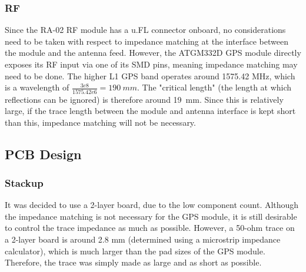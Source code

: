 \subsubsection{RF}
Since the RA-02 RF module has a u.FL connector onboard, no considerations need to be taken with respect to impedance matching at the interface between the module and the antenna feed. However, the ATGM332D GPS module directly exposes its RF input via one of its SMD pins, meaning impedance matching may need to be done. The higher L1 GPS band operates around 1575.42 MHz, which is a wavelength of $\frac{3e8}{1575.42e6} = \SI{190}{mm}$. The "critical length" (the length at which reflections can be ignored) is therefore around \SI{19}{mm}. Since this is relatively large, if the trace length between the module and antenna interface is kept short than this, impedance matching will not be necessary.

\subsection{PCB Design}
\subsubsection{Stackup}
It was decided to use a 2-layer board, due to the low component count. Although the impedance matching is not necessary for the GPS module, it is still desirable to control the trace impedance as much as possible. However, a 50-ohm trace on a 2-layer board is around 2.8 mm (determined using a microstrip impedance calculator), which is much larger than the pad sizes of the GPS module. Therefore, the trace was simply made as large and as short as possible.

